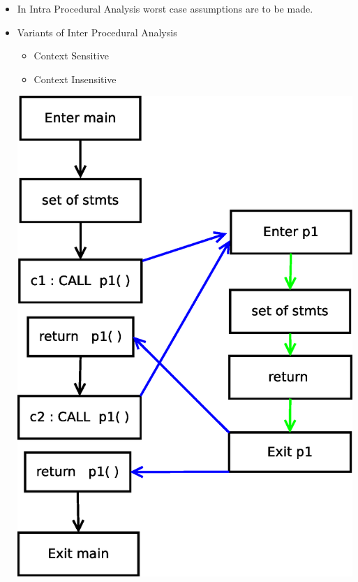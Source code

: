 \documentclass[mathserif,10pt]{beamer}
\begin{document}
\frame
{
  \frametitle{\subsecname}
  \begin{itemize}
   \item In Intra Procedural Analysis worst case assumptions are to be made. 
   \item Variants of Inter Procedural Analysis \\
	\begin{itemize}
	 \item Context Sensitive
	 \item Context Insensitive 
	\end{itemize}
	\centering  \includegraphics[scale=0.25]{Figures/Diagram2.eps}                 
  \end{itemize}

}
\end{document}
